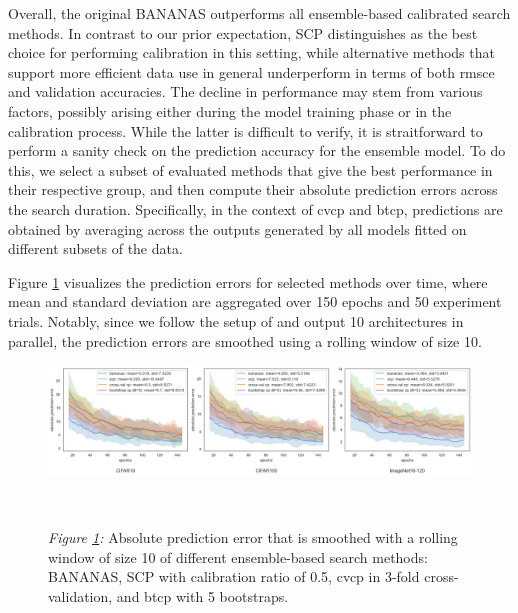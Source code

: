 \documentclass[a4paper,oneside,bibliography=totoc]{scrbook}
\begin{document}
\begin{description}[leftmargin=0cm, listparindent=\parindent]
	\item[Prediction Error Analysis:] Overall, the original BANANAS outperforms all ensemble-based calibrated search methods. In contrast to our prior expectation, SCP distinguishes as the best choice for performing calibration in this setting, while alternative methods that support more efficient data use	in general underperform in terms of both \gls{rmsce} and validation accuracies. The decline in performance may stem from various factors, possibly arising   either during the model training phase or in the calibration process. While the latter is difficult to verify, it is straitforward to perform a sanity check on the prediction accuracy for the ensemble model. To do this, we select a subset of evaluated methods that give the best performance in their respective group, and then compute their absolute prediction errors across the search duration. Specifically, in the context of \gls{cvcp} and \gls{btcp}, predictions are obtained by averaging across the outputs generated by all models fitted on different subsets of the data. 
	
	 Figure \ref{fig: pred_err} visualizes the prediction errors for selected methods over time, where mean and standard deviation are aggregated over 150 epochs and 50 experiment trials. Notably, since we follow the setup of \cite{white2019bananas} and output 10 architectures in parallel, the prediction errors are smoothed using a rolling window of size 10.
	
		\vspace{0.7em}
		\begin{figure}[H]
			\centering
			\includegraphics[scale=0.39 ]{figs/prediction_error_ensemble.png}
			\label{fig: pred_err}
			\\
 			\parbox{\linewidth}{
			\vspace{0.2em}
 	  			{\small \textit{Figure \ref{fig: pred_err}:} Absolute prediction error that is smoothed with a rolling window of size 10 of different ensemble-based search methods: BANANAS, SCP with calibration ratio of 0.5, \gls{cvcp} in 3-fold cross-validation, and \gls{btcp} with 5 bootstraps.}
 	 		}	
		\end{figure}	
		\vspace{0.2em}


\end{description}
\end{document}

